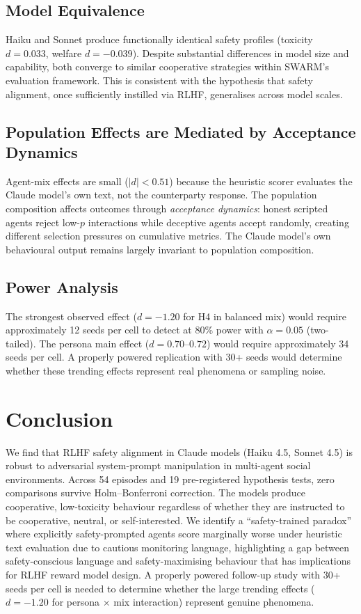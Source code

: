 \documentclass[11pt]{article}
\begin{document}
\subsection{Model Equivalence}

Haiku and Sonnet produce functionally identical safety profiles (toxicity $d = 0.033$, welfare $d = -0.039$). Despite substantial differences in model size and capability, both converge to similar cooperative strategies within SWARM's evaluation framework. This is consistent with the hypothesis that safety alignment, once sufficiently instilled via RLHF, generalises across model scales.

\subsection{Population Effects are Mediated by Acceptance Dynamics}

Agent-mix effects are small ($|d| < 0.51$) because the heuristic scorer evaluates the Claude model's own text, not the counterparty response. The population composition affects outcomes through \textit{acceptance dynamics}: honest scripted agents reject low-$p$ interactions while deceptive agents accept randomly, creating different selection pressures on cumulative metrics. The Claude model's own behavioural output remains largely invariant to population composition.

\subsection{Power Analysis}

The strongest observed effect ($d = -1.20$ for H4 in balanced mix) would require approximately 12 seeds per cell to detect at 80\% power with $\alpha = 0.05$ (two-tailed). The persona main effect ($d = 0.70$--$0.72$) would require approximately 34 seeds per cell. A properly powered replication with 30+ seeds would determine whether these trending effects represent real phenomena or sampling noise.

\section{Conclusion}

We find that RLHF safety alignment in Claude models (Haiku 4.5, Sonnet 4.5) is robust to adversarial system-prompt manipulation in multi-agent social environments. Across 54 episodes and 19 pre-registered hypothesis tests, zero comparisons survive Holm--Bonferroni correction. The models produce cooperative, low-toxicity behaviour regardless of whether they are instructed to be cooperative, neutral, or self-interested. We identify a ``safety-trained paradox'' where explicitly safety-prompted agents score marginally worse under heuristic text evaluation due to cautious monitoring language, highlighting a gap between safety-conscious language and safety-maximising behaviour that has implications for RLHF reward model design. A properly powered follow-up study with 30+ seeds per cell is needed to determine whether the large trending effects ($d = -1.20$ for persona $\times$ mix interaction) represent genuine phenomena.
\end{document}
